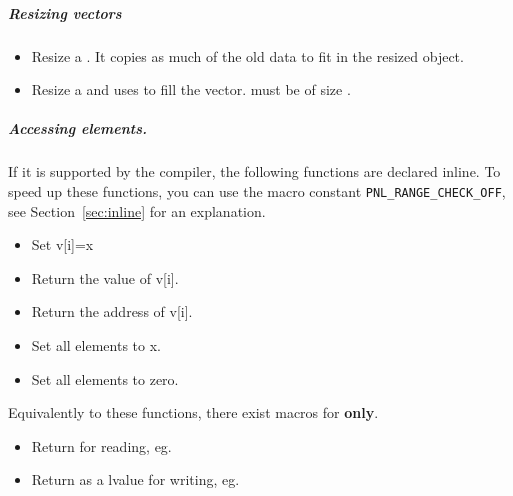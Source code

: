 \subparagraph{Resizing vectors}
\begin{itemize}
\item {}
  \sshortdescribe Resize a . It copies as much of the old
  data to fit in the resized object.
\item {} 
  \sshortdescribe Resize a  and uses  to fill the
  vector.  must be of size .
\end{itemize}  

\subparagraph{Accessing elements.}

If it is supported by the compiler, the following functions are declared
inline. To speed up these functions, you can use the macro constant
\texttt{PNL_RANGE_CHECK_OFF}, see Section~\ref{sec:inline} for an explanation. 

\begin{itemize}
\item {}
  \sshortdescribe Set v[i]=x  
\item {}
  \sshortdescribe Return the value of v[i].  
\item {}
  \sshortdescribe Return the address of v[i].  
\item {}
  \sshortdescribe Set all elements to x.  
\item {}
  \sshortdescribe Set all elements to zero.  
\end{itemize}
Equivalently to these functions, there exist macros for {\bf {} only}.
\begin{itemize}
\item {}
  \sshortdescribe Return  for reading, eg. 
  
\item {}
  \sshortdescribe Return  as a lvalue for writing, eg.
\end{itemize}


